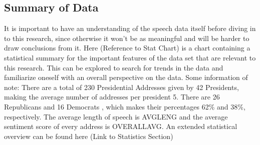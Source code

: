 \subsection{Summary of Data}
It is important to have an understanding of the speech data itself before diving in to this research, since otherwise it won't be as meaningful and will be harder to draw conclusions from it. Here (Reference to Stat Chart) is a chart containing a statistical summary for the important features of the data set that are relevant to this research.
This can be explored to search for trends in the data and familiarize oneself with an overall perspective on the data.
Some information of note: 
There are a total of 230 Presidential Addresses given by 42 Presidents, making the average number of addresses per president 5. 
There are 26 Republicans and 16 Democrats , which makes their percentages 62\% and 38\%, respectively.
The average length of speech is AVGLENG and the average sentiment score of every address is OVERALLAVG.
An extended statistical overview can be found here (Link to Statistics Section)

